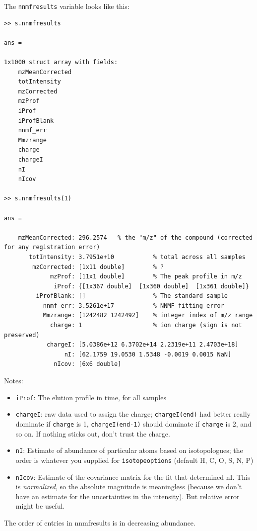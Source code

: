 \documentclass[notitlepage]{revtex4-1}
\begin{document}
The \verb|nnmfresults| variable looks like this:
\begin{verbatim}
>> s.nnmfresults

ans = 

1x1000 struct array with fields:
    mzMeanCorrected
    totIntensity
    mzCorrected
    mzProf
    iProf
    iProfBlank
    nnmf_err
    Mmzrange
    charge
    chargeI
    nI
    nIcov

>> s.nnmfresults(1)

ans = 

    mzMeanCorrected: 296.2574   % the "m/z" of the compound (corrected for any registration error)
       totIntensity: 3.7951e+10           % total across all samples
        mzCorrected: [1x11 double]        % ?
             mzProf: [11x1 double]        % The peak profile in m/z
              iProf: {[1x367 double]  [1x360 double]  [1x361 double]}
         iProfBlank: []                   % The standard sample
           nnmf_err: 3.5261e+17           % NNMF fitting error
           Mmzrange: [1242482 1242492]    % integer index of m/z range
             charge: 1                    % ion charge (sign is not preserved)
            chargeI: [5.0386e+12 6.3702e+14 2.2319e+11 2.4703e+18]
                 nI: [62.1759 19.0530 1.5348 -0.0019 0.0015 NaN]
              nIcov: [6x6 double]

\end{verbatim}
Notes:
\begin{itemize}
\item \verb|iProf|:    The elution profile in time, for all samples
\item \verb|chargeI|:   raw data used to assign the charge; \verb|chargeI(end)| had better really dominate if \verb|charge| is 1, \verb|chargeI(end-1)| should dominate if \verb|charge| is 2, and so on. If nothing sticks out, don't trust the charge.
\item \verb|nI|:     Estimate of abundance of particular atoms based on isotopologues; the order is whatever you supplied for \verb|isotopeoptions| (default H, C, O, S, N, P)
\item \verb|nIcov|:   Estimate of the covariance matrix for the fit that determined nI. This is \emph{normalized}, so the absolute magnitude is meaningless (because we don't have an estimate for the uncertainties in the intensity).  But relative error might be useful.
\end{itemize}

The order of entries in nnmfresults is in decreasing abundance.
\end{document}
